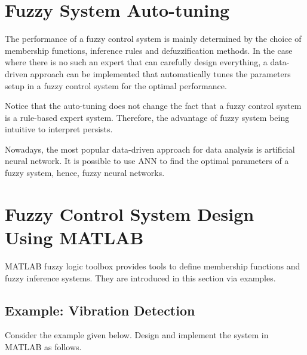 \section{Fuzzy System Auto-tuning}

The performance of a fuzzy control system is mainly determined by the choice of membership functions, inference rules and defuzzification methods. In the case where there is no such an expert that can carefully design everything, a data-driven approach can be implemented that automatically tunes the parameters setup in a fuzzy control system for the optimal performance. 

Notice that the auto-tuning does not change the fact that a fuzzy control system is a rule-based expert system. Therefore, the advantage of fuzzy system being intuitive to interpret persists.

Nowadays, the most popular data-driven approach for data analysis is artificial neural network. It is possible to use ANN to find the optimal parameters of a fuzzy system, hence, fuzzy neural networks. 















\section{Fuzzy Control System Design Using MATLAB}

MATLAB fuzzy logic toolbox provides tools to define membership functions and fuzzy inference systems. They are introduced in this section via examples.

\subsection{Example: Vibration Detection}

Consider the example given below. Design and implement the system in MATLAB as follows.

